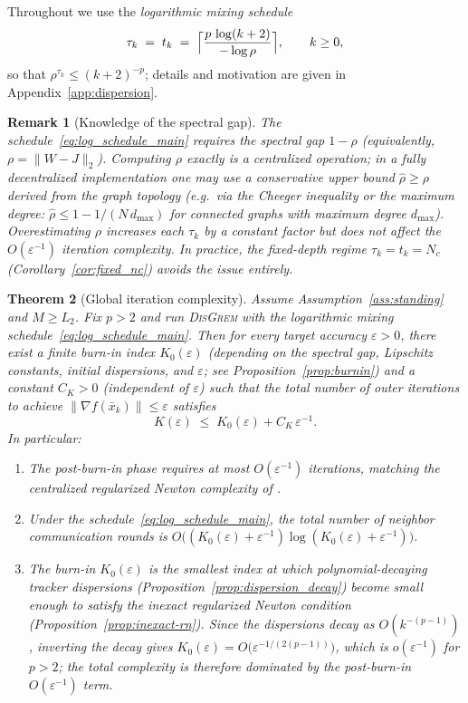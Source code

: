 \documentclass[11pt,a4paper]{article}
\def\cO{O}%
\def\one{1}%
\def\J{J}%
\newtheorem{theorem}{Theorem}[section]
\newtheorem{remark}[theorem]{Remark}
\newcommand{\one}{\mathbf{1}}
\newcommand{\cO}{\mathcal{O}}
\newcommand{\J}{\left(\frac{1}{N}\one\one^\top\right)}
\begin{document}
Throughout we use the \emph{logarithmic mixing schedule}
\begin{equation}\label{eq:log_schedule_main}
  \tau_k \;=\; t_k \;=\; \Bigl\lceil \frac{p\,\log(k+2)}{-\log\rho} \Bigr\rceil,
  \qquad k\ge 0,
\end{equation}
so that $\rho^{\tau_k}\le(k+2)^{-p}$; details and motivation are given in
Appendix~\ref{app:dispersion}.

\begin{remark}[Knowledge of the spectral gap]\label{rem:rho_knowledge}
The schedule~\eqref{eq:log_schedule_main} requires the spectral
gap $1{-}\rho$ (equivalently, $\rho=\|W{-}\J\|_2$).
Computing $\rho$ exactly is a centralized operation; in a fully
decentralized implementation one may use a conservative upper
bound $\hat\rho\ge\rho$ derived from the graph topology
(e.g.\ via the Cheeger inequality or the maximum degree:
$\hat\rho\le 1-1/(N\,d_{\max})$ for connected graphs with
maximum degree $d_{\max}$).
Overestimating $\rho$ increases each $\tau_k$ by a constant
factor but does not affect the $\cO(\varepsilon^{-1})$ iteration
complexity.
In practice, the fixed-depth regime $\tau_k{=}t_k{=}N_c$
(Corollary~\ref{cor:fixed_nc}) avoids the issue entirely.
\end{remark}

\begin{theorem}[Global iteration complexity]\label{thm:main}
Assume Assumption~\ref{ass:standing} and $M\ge L_2$.
Fix $p>2$ and run \textsc{DisGrem} with the logarithmic mixing schedule~\eqref{eq:log_schedule_main}.
Then for every target accuracy $\varepsilon>0$, there exist a finite burn-in index $K_0(\varepsilon)$
(depending on the spectral gap, Lipschitz constants, initial dispersions, and $\varepsilon$;
see Proposition~\ref{prop:burnin})
and a constant $C_K>0$ (independent of $\varepsilon$) such that the total number of
outer iterations to achieve $\|\nabla f(\bar x_k)\|\le \varepsilon$ satisfies
\[
K(\varepsilon)\;\le\; K_0(\varepsilon) + C_K\,\varepsilon^{-1}.
\]
In particular:
\begin{enumerate}[leftmargin=1.2em,itemsep=2pt]
\item The post-burn-in phase requires at most $\cO(\varepsilon^{-1})$ iterations,
matching the centralized regularized Newton complexity of \citet{mishchenko2023rn}.
\item Under the schedule~\eqref{eq:log_schedule_main}, the total number of neighbor communication rounds is
$\cO\big((K_0(\varepsilon)+\varepsilon^{-1})\log(K_0(\varepsilon)+\varepsilon^{-1})\big)$.
\item The burn-in $K_0(\varepsilon)$ is the smallest index at which
polynomial-decaying tracker dispersions
(Proposition~\ref{prop:dispersion_decay}) become small enough to satisfy the
inexact regularized Newton condition (Proposition~\ref{prop:inexact-rn}).
Since the dispersions decay as $\cO(k^{-(p-1)})$, inverting the decay gives
$K_0(\varepsilon)=\cO\!\bigl(\varepsilon^{-1/(2(p-1))}\bigr)$,
which is $o(\varepsilon^{-1})$ for $p>2$; the total complexity is therefore
dominated by the post-burn-in $\cO(\varepsilon^{-1})$ term.
\end{enumerate}
\end{theorem}
\end{document}
